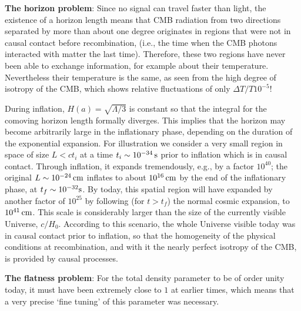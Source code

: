 \documentclass[a4paper,11pt]{article}
\begin{document}
{\noindent}\textbf{The horizon problem}: Since no signal can travel faster than light, the existence of a horizon length means that CMB radiation from two directions separated by more than about one degree originates in regions that were not in causal contact before recombination, (i.e., the time when the CMB photons interacted with matter the last time). Therefore, these two regions have never been able to exchange information, for example about their temperature. Nevertheless their temperature is the same, as seen from the high degree of isotropy of the CMB, which shows relative fluctuations of only $\Delta T/T10^{-5}$!

{\noindent}During inflation, $H(a)=\sqrt{\Lambda/3}$ is constant so that the integral for the comoving horizon length formally diverges. This implies that the horizon may become arbitrarily large in the inflationary phase, depending on the duration of the exponential expansion. For illustration we consider a very small region in space of size $L<ct_i$ at a time $t_i\sim10^{-34}\,{\rm s}$ prior to inflation which is in causal contact. Through inflation, it expands tremendously, e.g., by a factor $10^{40}$; the original $L\sim10^{-24}\,{\rm cm}$ inflates to about $10^{16}\,{\rm cm}$ by the end of the inflationary phase, at $t_f\sim10^{-32}{\rm s}$. By today, this spatial region will have expanded by another factor of $10^{25}$ by following (for $t>t_f$) the normal cosmic expansion, to   $10^{41}\,{\rm cm}$. This scale is considerably larger than the size of the currently visible Universe, $c/H_0$. According to this scenario, the whole Universe visible today was in causal contact prior to inflation, so that the homogeneity of the physical conditions at recombination, and with it the nearly perfect isotropy of the CMB, is provided by causal processes.

{\noindent}\textbf{The flatness problem}: For the total density parameter to be of order unity today, it must have been extremely close to $1$ at earlier times, which means that a very precise `fine tuning' of this parameter was necessary.
\end{document}
